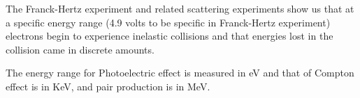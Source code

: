 The Franck-Hertz experiment and related scattering experiments show us that at a specific energy range (4.9 volts to be specific in Franck-Hertz experiment) electrons begin to experience inelastic collisions and that energies lost in the collision came in discrete amounts.

The energy range for Photoelectric effect is measured in eV and that of Compton effect is in KeV, and pair production is in MeV.